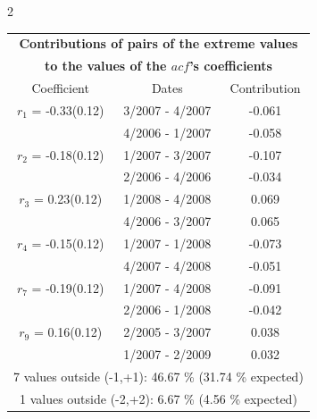 
\thispagestyle{empty}
\begin{multicols}{2}{ 
\begin{tabular}{ccc}
\multicolumn{3}{c}{\textbf{Contributions of pairs of the extreme values} }  \vspace{-.10in}  \\ 
\multicolumn{3}{c}{ \textbf{to the values of the $acf$'s coefficients}} \\ 
\hline 
\hline                  Coefficient  &  Dates &  Contribution \\ 
\hline 
  $r_{ 1}$ = -0.33(0.12) &       3/2007 -  4/2007 &       -0.061    \vspace{-.10in} \\ 
  &        4/2006 -  1/2007 &       -0.058  \vspace{-.02in}   \\ \hline 
    $r_{ 2}$ = -0.18(0.12) &       1/2007 -  3/2007 &       -0.107    \vspace{-.10in} \\ 
  &        2/2006 -  4/2006 &       -0.034  \vspace{-.02in}   \\ \hline 
    $r_{ 3}$ = 0.23(0.12) &       1/2008 -  4/2008 &        0.069   \vspace{-.10in} \\  
&        4/2006 -  3/2007 &        0.065  \vspace{-.02in} \\ \hline 
  $r_{ 4}$ = -0.15(0.12) &       1/2007 -  1/2008 &       -0.073    \vspace{-.10in} \\ 
  &        4/2007 -  4/2008 &       -0.051  \vspace{-.02in}   \\ \hline 
    $r_{ 7}$ = -0.19(0.12) &       1/2007 -  4/2008 &       -0.091    \vspace{-.10in} \\ 
  &        2/2006 -  1/2008 &       -0.042  \vspace{-.02in}   \\ \hline 
    $r_{ 9}$ = 0.16(0.12) &       2/2005 -  3/2007 &        0.038   \vspace{-.10in} \\  
&        1/2007 -  2/2009 &        0.032  \vspace{-.02in} \\ \hline 
\multicolumn{3}{c}{               7 values outside (-1,+1): 46.67  \% (31.74  \% expected)}\vspace{-.10in} \\ 
\multicolumn{3}{c}{               1 values outside (-2,+2):  6.67 \%  (4.56 \% expected) } \\
 \end{tabular} \\ 
 } 
\end{multicols} 
